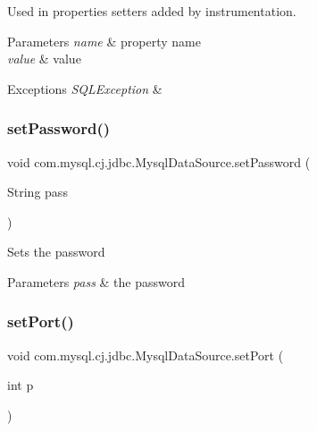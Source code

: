 Used in properties setters added by instrumentation.


\begin{DoxyParams}{Parameters}
{\em name} & property name \\
\hline
{\em value} & value \\
\hline
\end{DoxyParams}

\begin{DoxyExceptions}{Exceptions}
{\em S\+Q\+L\+Exception} & \\
\hline
\end{DoxyExceptions}
\mbox{\label{classcom_1_1mysql_1_1cj_1_1jdbc_1_1_mysql_data_source_aba660c9f74325976f0a4b217f833f163}} 
\subsubsection{\texorpdfstring{set\+Password()}{setPassword()}}
{\footnotesize\ttfamily void com.\+mysql.\+cj.\+jdbc.\+Mysql\+Data\+Source.\+set\+Password (\begin{DoxyParamCaption}\item[{String}]{pass }\end{DoxyParamCaption})}

Sets the password


\begin{DoxyParams}{Parameters}
{\em pass} & the password \\
\hline
\end{DoxyParams}
\mbox{\label{classcom_1_1mysql_1_1cj_1_1jdbc_1_1_mysql_data_source_a008a1d301424119b5820fa8e3acd1ce7}} 
\subsubsection{\texorpdfstring{set\+Port()}{setPort()}}
{\footnotesize\ttfamily void com.\+mysql.\+cj.\+jdbc.\+Mysql\+Data\+Source.\+set\+Port (\begin{DoxyParamCaption}\item[{int}]{p }\end{DoxyParamCaption})}

